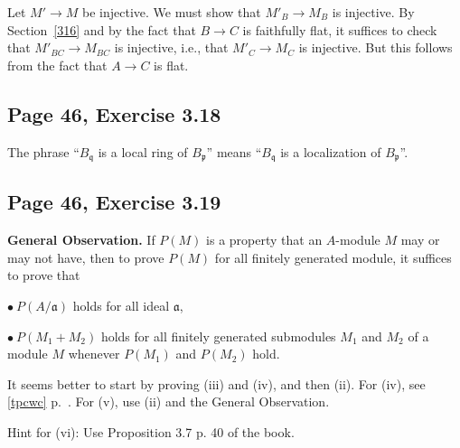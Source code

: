 \documentclass[parskip=half,fontsize=12pt]{scrartcl}%
\newcommand{\oo}{\operatorname}\newcommand{\ooo}{\operatorname*}
\newcommand{\mf}{\mathfrak}
\newcommand{\aaa}{\mf a}
\newcommand{\ppp}{\mf p}
\newcommand{\qqq}{\mf q}
\newcommand{\Ann}{\oo{Ann}}
\newcommand{\bu}{\bullet}
\begin{document}
Let $M'\to M$ be injective. We must show that $M'_B\to M_B$ is injective.  By Section~\ref{316} and by the fact that $B\to C$ is faithfully flat, it suffices to check that $M'_{BC}\to M_{BC}$ is injective, i.e., that $M'_C\to M_C$ is injective. But this follows from the fact that $A\to C$ is flat.

\subsection{Page 46, Exercise 3.18}%

The phrase ``$B_\qqq$ is a local ring of $B_\ppp$'' means ``$B_\qqq$ is a localization of $B_\ppp$''.

\subsection{Page 46, Exercise 3.19}%

\textbf{General Observation.} If $P(M)$ is a property that an $A$-module $M$ may or may not have, then to prove $P(M)$ for all finitely generated module, it suffices to prove that 

$\bu\ P(A/\aaa)$ holds for all ideal $\aaa$,

$\bu\ P(M_1+M_2)$ holds for all finitely generated submodules $M_1$ and $M_2$ of a module $M$ whenever $P(M_1)$ and $P(M_2)$ hold.

It seems better to start by proving (iii) and (iv), and then (ii). For (iv), see \eqref{tpcwc} p.~\pageref{tpcwc}. For (v), use (ii) and the General Observation. 

Hint for (vi): Use Proposition 3.7 p. 40 of the book.

\end{document}
